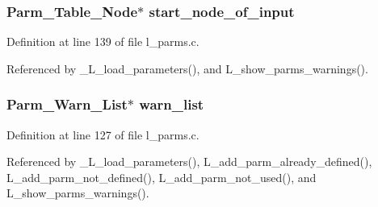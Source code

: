 \subsubsection{\setlength{\rightskip}{0pt plus 5cm}\bf{Parm\_\-Table\_\-Node}$\ast$ \bf{start\_\-node\_\-of\_\-input}}\label{l__parms_8c_40b9004e8ee8e4c9b4cd1f20945241b4}




Definition at line 139 of file l\_\-parms.c.

Referenced by \_\-L\_\-load\_\-parameters(), and L\_\-show\_\-parms\_\-warnings().
\subsubsection{\setlength{\rightskip}{0pt plus 5cm}\bf{Parm\_\-Warn\_\-List}$\ast$ \bf{warn\_\-list}}\label{l__parms_8c_95c32800b7e93bd491ac6054521d1519}




Definition at line 127 of file l\_\-parms.c.

Referenced by \_\-L\_\-load\_\-parameters(), L\_\-add\_\-parm\_\-already\_\-defined(), L\_\-add\_\-parm\_\-not\_\-defined(), L\_\-add\_\-parm\_\-not\_\-used(), and L\_\-show\_\-parms\_\-warnings().
